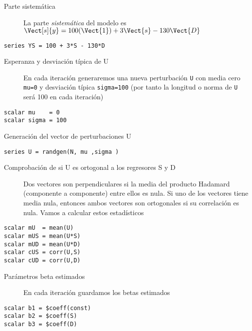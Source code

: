 \documentclass[11pt]{article}
\begin{document}
\begin{description}
\item[{Parte sistemática}] La parte \emph{sistemática} del modelo es
\(\Vect[s]{y} = 100(\Vect{1}) + 3\Vect{s} - 130\Vect{D}\)
\end{description}
\begin{verbatim}
series YS = 100 + 3*S - 130*D
\end{verbatim}

\begin{description}
\item[{Esperanza y desviación típica de U}] En cada iteración generaremos
una nueva perturbación \texttt{U} con media cero \texttt{mu=0} y desviación típica
\texttt{sigma=100} (por tanto la longitud o norma de \texttt{U} será 100 en cada
iteración)
\end{description}
\begin{verbatim}
scalar mu    = 0
scalar sigma = 100
\end{verbatim}

\begin{description}
\item[{Generación del vector de perturbaciones U}] 
\end{description}
\begin{verbatim}
series U = randgen(N, mu ,sigma )
\end{verbatim}

\begin{description}
\item[{Comprobación de si U es ortogonal a los regresores S y D}] Dos
vectores son perpendiculares si la media del producto Hadamard
(componente a componente) entre ellos es nula. Si uno de los
vectores tiene media nula, entonces ambos vectores son ortogonales
si su correlación es nula. Vamos a calcular estos estadísticos
\end{description}
\begin{verbatim}
scalar mU  = mean(U)
scalar mUS = mean(U*S)
scalar mUD = mean(U*D)
scalar cUS = corr(U,S)
scalar cUD = corr(U,D)
\end{verbatim}

\begin{description}
\item[{Parámetros beta estimados}] En cada iteración guardamos los betas
estimados
\end{description}
\begin{verbatim}
scalar b1 = $coeff(const)
scalar b2 = $coeff(S)
scalar b3 = $coeff(D)
\end{verbatim}
\end{document}
